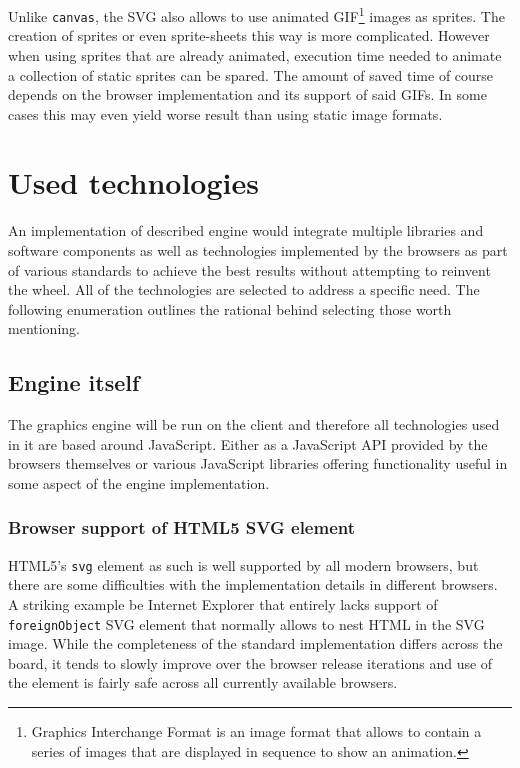 \documentclass[11pt,oneside, final]{fithesis2}
\begin{document}
Unlike \texttt{canvas}, the SVG also allows to use animated GIF\footnote{Graphics Interchange Format is an image format that allows to contain a series of images that are displayed in sequence to show an animation\cite{gifstandard}.} images as sprites. The creation of sprites or even sprite-sheets this way is more complicated. However when using sprites that are already animated, execution time needed to animate a collection of static sprites can be spared. The amount of saved time of course depends on the browser implementation and its support of said GIFs. In some cases this may even yield worse result than using static image formats.

\chapter{Used technologies}
\label{tech}
An implementation of described engine would integrate multiple libraries and software components as well as technologies implemented by the browsers as part of various standards to achieve the best results without attempting to reinvent the wheel. All of the technologies are selected to address a specific need. The following enumeration outlines the rational behind selecting those worth mentioning.

\section{Engine itself}
The graphics engine will be run on the client and therefore all technologies used in it are based around JavaScript. Either as a JavaScript API provided by the browsers themselves or various JavaScript libraries offering functionality useful in some aspect of the engine implementation.

\subsection{Browser support of HTML5 SVG element}
HTML5's \texttt{svg} element as such is well supported by all modern browsers\cite{html5svg}, but there are some difficulties with the implementation details in different browsers. A striking example be Internet Explorer that entirely lacks support of \texttt{foreignObject} SVG element that normally allows to nest HTML in the SVG image\cite{ieforeignobject}. While the completeness of the standard implementation differs across the board, it tends to slowly improve over the browser release iterations and use of the element is fairly safe across all currently available browsers.
\end{document}
